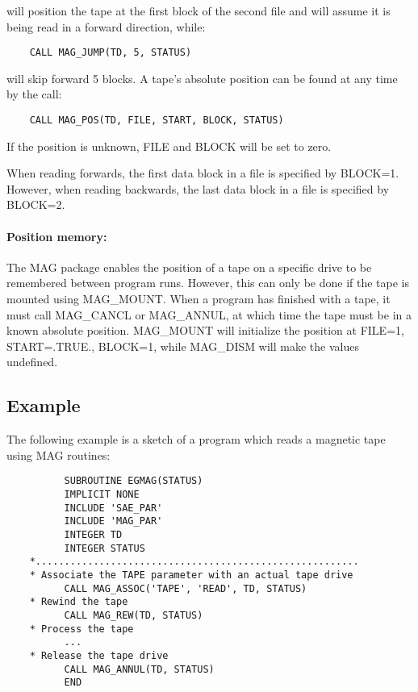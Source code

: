 will position the tape at the first block of the second file and will assume
it is being read in a forward direction, while:

\begin{small}
\begin{verbatim}
    CALL MAG_JUMP(TD, 5, STATUS)
\end{verbatim}
\end{small}

will skip forward 5 blocks.
A tape's absolute position can be found at any time by the call:

\begin{small}
\begin{verbatim}
    CALL MAG_POS(TD, FILE, START, BLOCK, STATUS)
\end{verbatim}
\end{small}

If the position is unknown, FILE and BLOCK will be set to zero.

When reading forwards, the first data block in a file is specified by BLOCK=1.
However, when reading backwards, the last data block in a file is specified
by BLOCK=2.

\paragraph{Position memory:}\hfill
{}

The MAG package enables the position of a tape on a specific drive to be
remembered between program runs.
However, this can only be done if the tape is mounted using MAG\_MOUNT.
When a program has finished with a tape, it must call MAG\_CANCL or
MAG\_ANNUL, at which time the tape must be in a known absolute position.
MAG\_MOUNT will initialize the position at FILE=1, START=.TRUE., BLOCK=1, while
MAG\_DISM  will make the values undefined.

\subsection{Example}

The following example is a sketch of a program which reads a magnetic tape
using MAG routines:

\begin{small}
\begin{verbatim}
          SUBROUTINE EGMAG(STATUS)
          IMPLICIT NONE
          INCLUDE 'SAE_PAR'
          INCLUDE 'MAG_PAR'
          INTEGER TD
          INTEGER STATUS
    *........................................................
    * Associate the TAPE parameter with an actual tape drive
          CALL MAG_ASSOC('TAPE', 'READ', TD, STATUS)
    * Rewind the tape
          CALL MAG_REW(TD, STATUS)
    * Process the tape
          ...
    * Release the tape drive
          CALL MAG_ANNUL(TD, STATUS)
          END
\end{verbatim}
\end{small}

